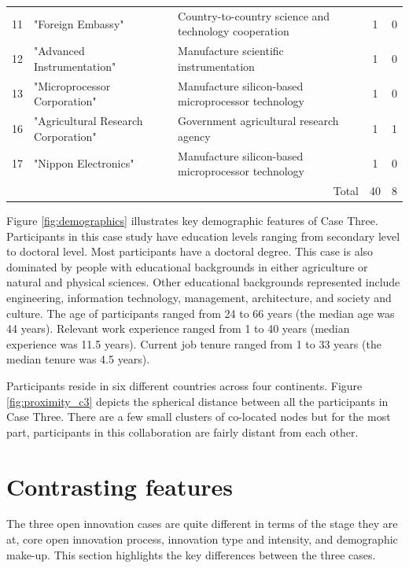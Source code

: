 \begin{table}[]
\begin{adjustbox}{width=\textwidth}
\begin{tabular}{@{}lllcc@{}}
\multicolumn{1}{c}{11} & "Foreign Embassy" & Country-to-country science and technology cooperation & 1 & 0 \\
\multicolumn{1}{c}{12} & "Advanced Instrumentation" & Manufacture scientific instrumentation & 1 & 0 \\
\multicolumn{1}{c}{13} & "Microprocessor Corporation" & Manufacture silicon-based microprocessor technology & 1 & 0 \\
\multicolumn{1}{c}{16} & "Agricultural Research Corporation" & Government agricultural research agency & 1 & 1 \\
\multicolumn{1}{c}{17} & "Nippon Electronics" & Manufacture silicon-based microprocessor technology & 1 & 0 \\ \cline{4-5}
 &  & \multicolumn{1}{r}{Total} & 40 & 8 \\ \bottomrule
\end{tabular}
\end{adjustbox}
\end{table}

Figure \ref{fig:demographics} illustrates key demographic features of Case Three. Participants in this case study have education levels ranging from secondary level to doctoral level. Most participants have a doctoral degree. This case is also dominated by people with educational backgrounds in either agriculture or natural and physical sciences. Other educational backgrounds represented include engineering, information technology, management, architecture, and society and culture. The age of participants ranged from 24 to 66 years (the median age was 44 years). Relevant work experience ranged from 1 to 40 years (median experience was 11.5 years). Current job tenure ranged from 1 to 33 years (the median tenure was 4.5 years). \medskip

Participants reside in six different countries across four continents. Figure \ref{fig:proximity_c3} depicts the spherical distance between all the participants in Case Three. There are a few small clusters of co-located nodes but for the most part, participants in this collaboration are fairly distant from each other. \medskip  

\section{Contrasting features}

The three open innovation cases are quite different in terms of the stage they are at, core open innovation process, innovation type and intensity, and demographic make-up. This section highlights the key differences between the three cases. \medskip 


